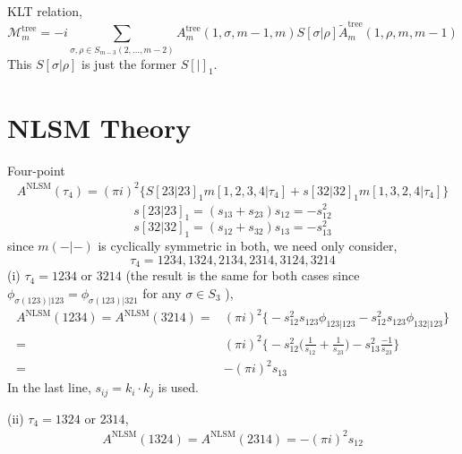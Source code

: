 \documentclass[a4paper,11pt]{article}
\begin{document}
KLT relation,
\begin{equation}
    \mathcal{M}^{\text{tree}}_m=
    -i\sum_{\sigma,\rho\in S_{m-3}({2},...,m-2)}A_m^{\text{tree}}(1,\sigma,m-1,m)S[\sigma|\rho]\tilde{A}_m^{\text{tree}}(1,\rho,m,m-1)
\end{equation}
This $S[\sigma|\rho]$ is just the former $S[|]_1$.\par


\section{NLSM Theory}
Four-point
\begin{equation}
    \begin{split}
    A^{\text{NLSM}}(\tau_4)=(\pi i)^2\bigg\{S[23|23]_1 m[1,2,3,4|\tau_4]+s[32|32]_1 m[1,3,2,4|\tau_4]\bigg\}
    \end{split}
\end{equation}
\begin{equation}
    s[23|23]_1=(s_{13}+s_{23})s_{12}=-s^2_{12}
\end{equation}
\begin{equation}
    s[32|32]_1=(s_{12}+s_{32})s_{13}=-s^2_{13}
\end{equation}
since $m(-|-)$ is cyclically symmetric in both, we need only consider,
\begin{equation}
    \tau_4=1234,1324,2134,2314,3124,3214
\end{equation}
(i) $\tau_4=1234$ or $3214$ (the result is the same for both cases since $\phi_{\sigma(123)|123}=\phi_{\sigma(123)|321}$ for any $\sigma\in S_3$ ),
\begin{equation}
    \begin{split}
    A^{\text{NLSM}}(1234)=A^{\text{NLSM}}(3214)=&(\pi i)^2\bigg\{-s^2_{12}s_{123} \phi_{123|123}-s^2_{12}s_{123} \phi_{132|123}\bigg\}\\
    =&(\pi i)^2\bigg\{-s^2_{12} \bigg(\frac{1}{s_{12}}+\frac{1}{s_{23}}\bigg)-s^2_{13}\frac{-1}{s_{23}}\bigg\}\\
    =&-(\pi i)^2 s_{13}
    \end{split}
\end{equation}
In the last line, $s_{ij}=k_i\cdot k_j$ is used.

(ii) $\tau_4=1324$ or $2314$,
\begin{equation}
    \begin{split}
    A^{\text{NLSM}}(1324)=A^{\text{NLSM}}(2314)=-(\pi i)^2 s_{12}
    \end{split}
\end{equation}
\end{document}
